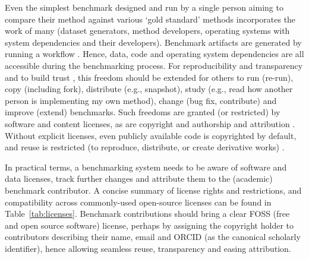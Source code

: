 \documentclass[11pt]{article}
\begin{document}
Even the simplest benchmark designed and run by a single person aiming to compare their method against various `gold standard' methods incorporates the work of many (dataset generators, method developers, operating systems with system dependencies and their developers). Benchmark artifacts are generated by running a workflow \cite{Jackson2021-ke}. Hence, data, code and operating system dependencies are all accessible during the benchmarking process. For reproducibility and transparency and to build trust \cite{Laine2007-py}, this freedom should be extended for others to run (re-run), copy (including fork), distribute (e.g., snapshot), study (e.g., read how another person is implementing my own method), change (bug fix, contribute) and improve (extend) benchmarks. Such freedoms are granted (or restricted) by software and content licenses, as are copyright and authorship and attribution \cite{Kreutzer2014-ua}. Without explicit licenses, even publicly available code is copyrighted by default, and reuse is restricted (to reproduce, distribute, or create derivative works) \cite{Kreutzer2014-ua}. 

In practical terms, a benchmarking system needs to be aware of software and data licenses, track further changes and attribute them to the (academic) benchmark contributor. A concise summary of license rights and restrictions, and compatibility across commonly-used open-source licenses can be found in Table~\ref{tab:licenses}. Benchmark contributions should bring a clear FOSS (free and open source software) license, perhaps by assigning the copyright holder to contributors describing their name, email and ORCID (as the canonical scholarly identifier), hence allowing seamless reuse, transparency and easing attribution.
\end{document}
